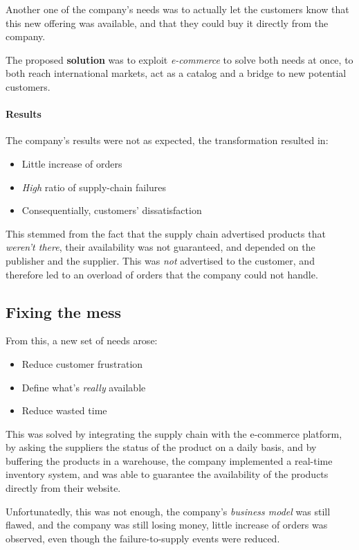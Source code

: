 \documentclass[openright, twoside, twocolumn]{report}
\begin{document}
Another one of the company's needs was to actually let the customers know that this new offering was available, and that they could buy it directly from the company.

The proposed \textbf{solution} was to exploit \emph{e-commerce} to solve both needs at once, to both reach international markets, act as a catalog and
a bridge to new potential customers.

\paragraph{Results}

The company's results were not as expected, the transformation resulted in:

\begin{itemize}
  \item Little increase of orders
  \item \emph{High} ratio of supply-chain failures
  \item Consequentially, customers' dissatisfaction
\end{itemize}

This stemmed from the fact that the supply chain advertised products that \emph{weren't there}, their availability was not guaranteed, and depended on
the publisher and the supplier. This was \emph{not} advertised to the customer, and therefore led to an overload of orders that the company could not
handle.

\subsection{Fixing the mess}

From this, a new set of needs arose:

\begin{itemize}
  \item Reduce customer frustration
  \item Define what's \emph{really} available
  \item Reduce wasted time
\end{itemize}

This was solved by integrating the supply chain with the e-commerce platform, by asking the suppliers the status of the product on a daily basis, and by
buffering the products in a warehouse, the company implemented a real-time inventory system, and was able to guarantee the availability of the products
directly from their website.

Unfortunatedly, this was not enough, the company's \emph{business model} was still flawed, and the company was still losing money, little
increase of orders was observed, even though the failure-to-supply events were reduced.
\end{document}
